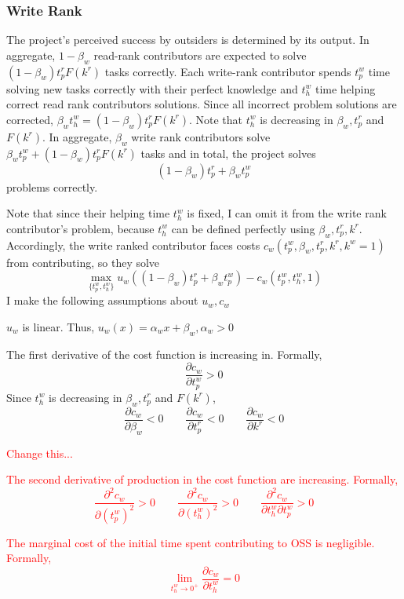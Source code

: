 \documentclass[12pt,notitlepage]{article}
\begin{document}
\subsubsection{Write Rank}
The project's perceived success by outsiders is determined by its output. In aggregate, $1-\beta_w$ read-rank contributors are expected to solve $(1-\beta_w) t_p^rF(k^r)$ tasks correctly. Each write-rank contributor spends $t_p^w$ time solving new tasks correctly with their perfect knowledge and $t_h^w$ time helping correct read rank contributors solutions. Since all incorrect problem solutions are corrected, $\beta_w t_h^w = (1-\beta_w) t_p^rF(k^r)$. Note that $t_h^w$ is decreasing in $\beta_w, t_p^r$ and $F(k^r)$. In aggregate, $\beta_w$ write rank contributors solve $\beta_w t_p^w + (1-\beta_w) t_p^rF(k^r)$ tasks and in total, the project solves
$$(1-\beta_w) t_p^r + \beta_w t_p^w $$
problems correctly.

\qquad Note that since their helping time $t_h^w$ is fixed, I can omit it from the write rank contributor's problem, because $t_h^w$ can be defined perfectly using $\beta_w, t_p^r, k^r$. Accordingly, the write ranked contributor faces costs $c_w(t_p^w, \beta_w, t_p^r, k^r, k^w = 1)$ from contributing, so they solve
$$\max_{\{t_p^w, t_h^w\}} u_w\left((1-\beta_w) t_p^r + \beta_w t_p^w \right) - c_w(t_p^w, t_h^w, 1)$$
I make the following assumptions about $u_w, c_w$
\begin{enumerate}
    \item $u_w$ is linear. Thus, $u_w(x) = \alpha_wx + \beta_w, \alpha_w > 0$
    \item The first derivative of the cost function is increasing in. Formally, 
    $$\frac{\partial c_w}{\partial t_p^w}>0 $$
    Since $t_h^w$ is decreasing in $\beta_w, t_p^r$ and $F(k^r)$,
    $$\frac{\partial c_w}{\partial \beta_w}<0 \qquad \frac{\partial c_w}{\partial t_p^r}<0 \qquad \frac{\partial c_w}{\partial k^r}<0$$
    \textcolor{red}{Change this...
    \item  The second derivative of production in the cost function are increasing. Formally, $$\frac{\partial^2 c_w}{\partial (t_p^w)^2}>0 \qquad  \frac{\partial^2 c_w}{\partial (t_h^w)^2}>0 \qquad  \frac{\partial^2 c_w}{\partial t_h^w \partial t_p^w}>0$$
    \item The marginal cost of the initial time spent contributing to OSS is negligible. Formally,
    $$\lim_{t_h^w \to 0^+} \frac{\partial c_w}{\partial t_h^w} = 0$$}
\end{enumerate}
\end{document}
